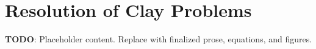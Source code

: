 
\section{Resolution of Clay Problems}
\label{sec:resolution-of-clay-problems}

\textbf{TODO}: Placeholder content. Replace with finalized prose, equations, and figures.


